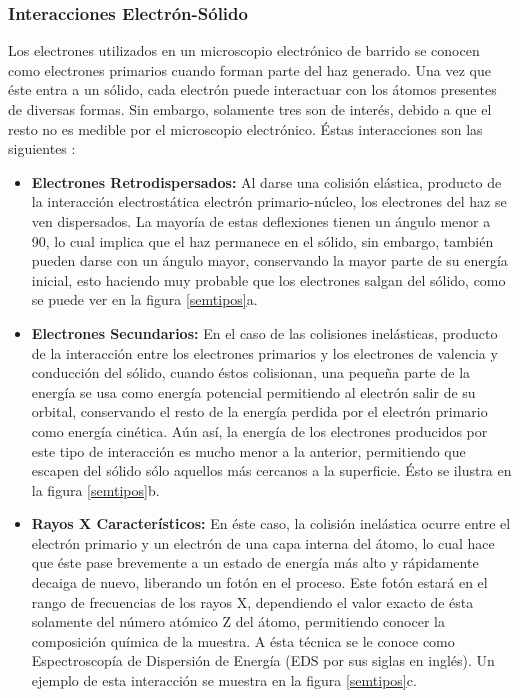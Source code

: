 \documentclass[../main.tex]{subfiles}
\begin{document}
\subsubsection{Interacciones Electrón-Sólido}
Los electrones utilizados en un microscopio electrónico de barrido se conocen como electrones primarios cuando forman parte del haz generado. Una vez que éste entra a un sólido, cada electrón puede interactuar con los átomos presentes de diversas formas. Sin embargo, solamente tres son de interés, debido a que el resto no es medible por el microscopio electrónico. Éstas interacciones son las siguientes \cite{Egerton2005}:
\begin{itemize}
    \item  \textbf{Electrones Retrodispersados:} Al darse una colisión elástica, producto de la interacción electrostática electrón primario-núcleo, los electrones del haz se ven dispersados. La mayoría de estas deflexiones tienen un ángulo menor a 90\grado, lo cual implica que el haz permanece en el sólido, sin embargo, también pueden darse con un ángulo mayor, conservando la mayor parte de su energía inicial, esto haciendo muy probable que los electrones salgan del sólido, como se puede ver en la figura \ref{semtipos}a.
    \item \textbf{Electrones Secundarios:} En el caso de las colisiones inelásticas, producto de la interacción entre los electrones primarios y los electrones de valencia y conducción del sólido, cuando éstos colisionan, una pequeña parte de la energía se usa como energía potencial permitiendo al electrón salir de su orbital, conservando el resto de la energía perdida por el electrón primario como energía cinética. Aún así, la energía de los electrones producidos por este tipo de interacción es mucho menor a la anterior, permitiendo que escapen del sólido sólo aquellos más cercanos a la superficie. Ésto se ilustra en la figura \ref{semtipos}b.
    \item \textbf{Rayos X Característicos:} En éste caso, la colisión inelástica ocurre entre el electrón primario y un electrón de una capa interna del átomo, lo cual hace que éste pase brevemente a un estado de energía más alto y rápidamente decaiga de nuevo, liberando un fotón en el proceso. Este fotón estará en el rango de frecuencias de los rayos X, dependiendo el valor exacto de ésta solamente del número atómico Z del átomo, permitiendo conocer la composición química de la muestra. A ésta técnica se le conoce como Espectroscopía de Dispersión de Energía (EDS por sus siglas en inglés). Un ejemplo de esta interacción se muestra en la figura \ref{semtipos}c.
\end{itemize}
\end{document}
